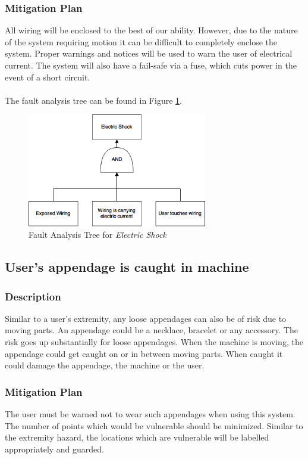 \documentclass[11pt]{article}
\begin{document}
\subsubsection*{Mitigation Plan}
All wiring will be enclosed to the best of our ability. However, due to the nature of the system requiring motion it can be difficult to completely enclose the system. Proper warnings and notices will be used to warn the user of electrical current. The system will also have a fail-safe via a fuse, which cuts power in the event of a short circuit. \\ \\

The fault analysis tree can be found in Figure \ref{fig:ft-electric}.

\begin{figure}[H]
   \centering
   \includegraphics[width=0.7\textwidth]{img/ft-electric.png} %
   \caption{Fault Analysis Tree for \textit{Electric Shock}}
   \label{fig:ft-electric}
\end{figure}

\subsection{User's appendage is caught in machine}
\subsubsection*{Description}
Similar to a user's extremity, any loose appendages can also be of risk due to moving parts. An appendage could be a necklace, bracelet or any accessory. The risk goes up substantially for loose appendages. When the machine is moving, the appendage could get caught on or in between moving parts. When caught it could damage the appendage, the machine or the user.
\subsubsection*{Mitigation Plan}
The user must be warned not to wear such appendages when using this system. The number of points which would be vulnerable should be minimized. Similar to the extremity hazard, the locations which are vulnerable will be labelled appropriately and guarded. \\ \\
\end{document}
